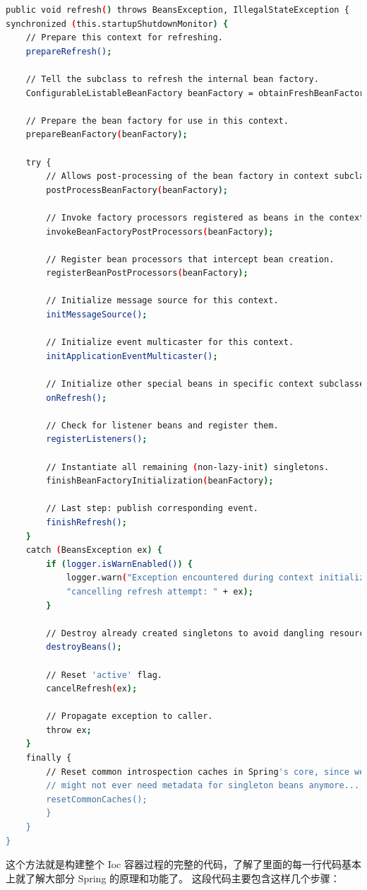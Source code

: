 \documentclass{book}
\begin{document}
\begin{lstlisting}[language=Bash]
public void refresh() throws BeansException, IllegalStateException {
synchronized (this.startupShutdownMonitor) {
	// Prepare this context for refreshing.
	prepareRefresh();
	
	// Tell the subclass to refresh the internal bean factory.
	ConfigurableListableBeanFactory beanFactory = obtainFreshBeanFactory();
	
	// Prepare the bean factory for use in this context.
	prepareBeanFactory(beanFactory);
	
	try {
		// Allows post-processing of the bean factory in context subclasses.
		postProcessBeanFactory(beanFactory);
		
		// Invoke factory processors registered as beans in the context.
		invokeBeanFactoryPostProcessors(beanFactory);
		
		// Register bean processors that intercept bean creation.
		registerBeanPostProcessors(beanFactory);
		
		// Initialize message source for this context.
		initMessageSource();
		
		// Initialize event multicaster for this context.
		initApplicationEventMulticaster();
		
		// Initialize other special beans in specific context subclasses.
		onRefresh();
		
		// Check for listener beans and register them.
		registerListeners();
		
		// Instantiate all remaining (non-lazy-init) singletons.
		finishBeanFactoryInitialization(beanFactory);
		
		// Last step: publish corresponding event.
		finishRefresh();
	}	
	catch (BeansException ex) {
		if (logger.isWarnEnabled()) {
			logger.warn("Exception encountered during context initialization - " +
			"cancelling refresh attempt: " + ex);
		}
		
		// Destroy already created singletons to avoid dangling resources.
		destroyBeans();
		
		// Reset 'active' flag.
		cancelRefresh(ex);
		
		// Propagate exception to caller.
		throw ex;
	}	
	finally {
		// Reset common introspection caches in Spring's core, since we
		// might not ever need metadata for singleton beans anymore...
		resetCommonCaches();
		}
	}
}
\end{lstlisting}

这个方法就是构建整个 Ioc 容器过程的完整的代码，了解了里面的每一行代码基本上就了解大部分 Spring 的原理和功能了。
这段代码主要包含这样几个步骤：
\end{document}
